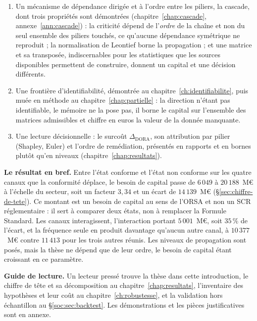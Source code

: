 \begin{enumerate}[leftmargin=1.4em,itemsep=3pt]
\item Un mécanisme de dépendance dirigée et à l'ordre entre les piliers, la cascade,
      dont trois propriétés sont démontrées (chapitre~\ref{chap:cascade},
      annexe~\ref{ann:cascade}) :
      la criticité dépend de l'\emph{ordre} de la chaîne et non du seul ensemble des piliers
      touchés, ce qu'aucune dépendance symétrique ne reproduit ; la normalisation de Leontief
      borne la propagation ; et une matrice et sa transposée, indiscernables pour les
      statistiques que les sources disponibles permettent de construire, donnent un capital et
      une décision différents.
\item Une frontière d'identifiabilité, démontrée au
      chapitre~\ref{ch:identifiabilite}, puis muée en méthode au
      chapitre~\ref{chap:partielle} : la direction n'étant pas
      identifiable, le mémoire ne la pose pas, il borne le capital sur l'ensemble des matrices
      admissibles et chiffre en euros la valeur de la donnée manquante.
\item Une lecture décisionnelle : le surcoût $\Delta_{\text{DORA}}$, son attribution
      par pilier (Shapley, Euler) et l'ordre de remédiation, présentés en rapports et en
      bornes plutôt qu'en niveaux (chapitre~\ref{chap:resultats}).
\end{enumerate}

\begin{cle}
\textbf{Le résultat en bref.} Entre l'état conforme et l'état non conforme sur les quatre canaux
que la conformité déplace, le besoin de capital passe de $6\,049$ à $20\,188$~M\euro{} à
l'échelle du secteur, soit un facteur $3{,}34$ et un écart de $14\,139$~M\euro{}
(\S\ref{sec:chiffre-de-tete}). Ce montant est un besoin de capital au sens de l'ORSA et non un
SCR réglementaire : il sert à comparer deux états, non à remplacer la Formule Standard. Les
canaux interagissent, l'interaction portant $5\,001$~M\euro{}, soit $35\,\%$ de l'écart, et la
fréquence seule en produit davantage qu'aucun autre canal, à $10\,377$~M\euro{} contre
$11\,413$ pour les trois autres réunis. Les niveaux de propagation sont posés, mais la thèse ne
dépend que de leur ordre, le besoin de capital étant croissant en ce paramètre.

\textbf{Guide de lecture.} Un lecteur pressé trouve la thèse dans cette introduction, le chiffre
de tête et sa décomposition au chapitre~\ref{chap:resultats}, l'inventaire des hypothèses et
leur coût au chapitre~\ref{ch:robustesse}, et la validation hors échantillon au
\S\ref{soc:sec:backtest}. Les démonstrations et les pièces justificatives sont en annexe.
\end{cle}

